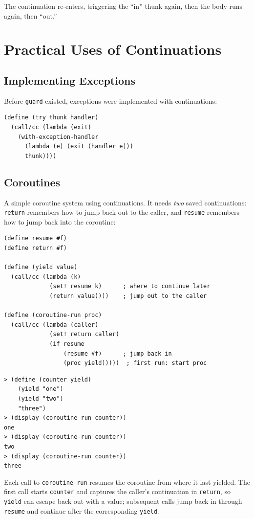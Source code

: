 The continuation re-enters, triggering the ``in'' thunk again, then the body runs again, then ``out.''

\section{Practical Uses of Continuations}

\subsection{Implementing Exceptions}

Before \texttt{guard} existed, exceptions were implemented with continuations:

\begin{lstlisting}
(define (try thunk handler)
  (call/cc (lambda (exit)
    (with-exception-handler
      (lambda (e) (exit (handler e)))
      thunk))))
\end{lstlisting}

\subsection{Coroutines}

A simple coroutine system using continuations. It needs \emph{two} saved continuations: \texttt{return} remembers how to jump back out to the caller, and \texttt{resume} remembers how to jump back into the coroutine:

\begin{lstlisting}
(define resume #f)
(define return #f)

(define (yield value)
  (call/cc (lambda (k)
             (set! resume k)      ; where to continue later
             (return value))))    ; jump out to the caller

(define (coroutine-run proc)
  (call/cc (lambda (caller)
             (set! return caller)
             (if resume
                 (resume #f)      ; jump back in
                 (proc yield)))))  ; first run: start proc
\end{lstlisting}

\begin{lstlisting}[style=repl]
> (define (counter yield)
    (yield "one")
    (yield "two")
    "three")
> (display (coroutine-run counter))
one
> (display (coroutine-run counter))
two
> (display (coroutine-run counter))
three
\end{lstlisting}

Each call to \texttt{coroutine-run} resumes the coroutine from where it last yielded. The first call starts \texttt{counter} and captures the caller's continuation in \texttt{return}, so \texttt{yield} can escape back out with a value; subsequent calls jump back in through \texttt{resume} and continue after the corresponding \texttt{yield}.

